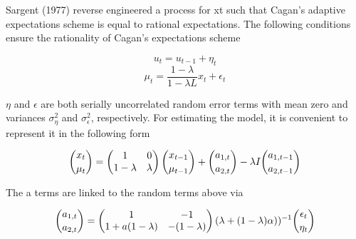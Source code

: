\documentclass[a4paper,12pt]{scrartcl} %
\begin{document}
Sargent (1977) reverse engineered a process for xt such that Cagan’s adaptive expectations scheme is equal to rational expectations. The following conditions ensure the rationality of Cagan’s expectations scheme

\begin{equation}\label{29}
    u_t=u_{t-1}+\eta_t
\end{equation}
\begin{equation}\label{30}
    \mu_t=\frac{1-\lambda}{1-\lambda L}x_t+\epsilon_t
\end{equation}

$\eta$ and $\epsilon$ are both serially uncorrelated random error terms with mean zero and variances $\sigma_{\eta}^2$ and $\sigma_{\epsilon}^2$, respectively. For estimating the model, it is convenient to represent it in the following form

\begin{equation}\label{31}
\dbinom{x_t}{\mu_t}=\left(
\begin{matrix}
1 & 0 \\
1-\lambda & \lambda
\end{matrix}
\right) \dbinom{x_{t-1}}{\mu_{t-1}}+\dbinom{a_{1,t}}{a_{2,t}}-\lambda I\dbinom{a_{1,t-1}}{a_{2,t-1}}
\end{equation}

The a terms are linked to the random terms above via

\begin{equation}\label{32}
\dbinom{a_{1,t}}{a_{2,t}}=\left(
\begin{matrix}
1 & -1 \\
1+a(1-\lambda) & -(1-\lambda)
\end{matrix}
\right) (\lambda+(1-\lambda)\alpha))^{-1}\dbinom{\epsilon_{t}}{\eta_{t}}
\end{equation}
\end{document}
